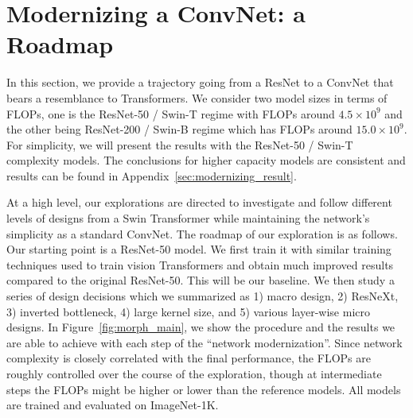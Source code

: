 \section{Modernizing a ConvNet: a Roadmap}
\label{sec:modernizing}
In this section, we provide a trajectory going from a ResNet to a ConvNet that bears a resemblance to Transformers. We consider two model sizes in terms of FLOPs, one is the ResNet-50 / Swin-T regime with FLOPs around $4.5\times 10^9$ and the other being ResNet-200 / Swin-B regime which has FLOPs around $15.0\times 10^9$. For simplicity, we will present the results with the ResNet-50 / Swin-T complexity models. The conclusions for higher capacity models are consistent and results can be found in Appendix~\ref{sec:modernizing_result}.

At a high level, our explorations are directed to investigate and follow different levels of designs from a Swin Transformer while maintaining the network's simplicity as a standard ConvNet. The roadmap of our exploration is as follows. Our starting point is a ResNet-50 model. We first train it with similar training techniques used to train vision Transformers and obtain much improved results compared to the original ResNet-50. This will be our baseline. We then study a series of design decisions which we summarized as 1) macro design, 2) ResNeXt, 3) inverted bottleneck, 4) large kernel size, and 5) various layer-wise micro designs. In Figure~\ref{fig:morph_main}, we show the procedure and the results we are able to achieve with each step of the ``network modernization''. Since network complexity is closely correlated with the final performance, the FLOPs are roughly controlled over the course of the exploration, though at intermediate steps the FLOPs might be higher or lower than the reference models. All models are trained and evaluated on ImageNet-1K.


